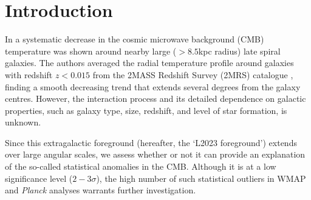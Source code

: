 \documentclass{aa}
\begin{document}

\maketitle

\section{Introduction}

In \citet[hereafter L2023]{luparello} a systematic decrease in the cosmic microwave background (CMB) temperature was shown around nearby large ($>8.5$\;kpc radius) late spiral galaxies. The authors averaged the radial temperature profile around galaxies with redshift $z<0.015$ from the 2MASS Redshift Survey (2MRS) catalogue \citep{2mrs}, finding a smooth decreasing trend that extends several degrees from the galaxy centres. However, the interaction process and its detailed dependence on galactic properties, such as galaxy type, size, redshift, and level of star formation, is unknown.

Since this extragalactic foreground (hereafter, the `L2023 foreground') extends over large angular scales, we assess whether or not it can provide an explanation of the so-called statistical anomalies in the CMB. Although it is at a low significance level ($2-3\sigma$), the high number of such statistical outliers in WMAP and \textit{Planck} analyses \citep[see][for a recent review]{anomalyrev} warrants further investigation.
\end{document}
